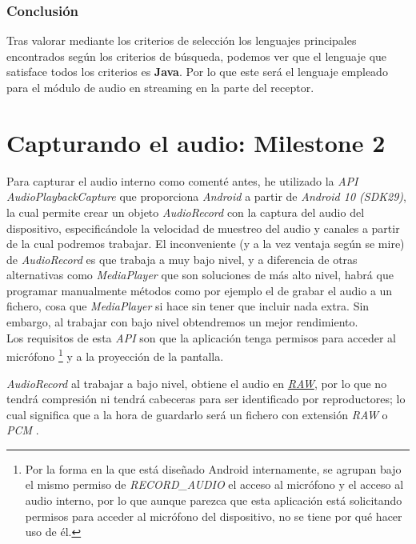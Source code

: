 \subsubsection{Conclusión}

Tras valorar mediante los criterios de selección los lenguajes principales
encontrados según los criterios de búsqueda, podemos ver que el lenguaje que
satisface todos los criterios es \textbf{Java}. Por lo que este será el lenguaje
empleado para el módulo de audio en streaming en la parte del receptor.


\section{Capturando el audio: Milestone 2}

Para capturar el audio interno como comenté antes, he utilizado la \emph{API
AudioPlaybackCapture} \cite{api-audio-capture} que proporciona \emph{Android} a
partir de \emph{Android 10 (SDK29)}, la cual permite crear un objeto
\emph{AudioRecord} \cite{clase-audiorecord} con la captura del audio del
dispositivo, especificándole la velocidad de muestreo del audio y canales a
partir de la cual podremos trabajar. El inconveniente (y a la vez ventaja según
se mire) de \emph{AudioRecord} es que trabaja a muy bajo nivel, y a diferencia
de otras alternativas como \emph{MediaPlayer} \cite{clase-mediaplayer} que son
soluciones de más alto nivel, habrá que programar manualmente métodos como por
ejemplo el de grabar el audio a un fichero, cosa que \emph{MediaPlayer} si hace
sin tener que incluir nada extra. Sin embargo, al trabajar con bajo nivel
obtendremos un mejor rendimiento.\\

Los requisitos de esta \emph{API} son que la
aplicación tenga permisos para acceder al micrófono \footnote{Por la forma en la
que está diseñado Android internamente, se agrupan bajo el mismo permiso de
\emph{RECORD\_AUDIO} el acceso al micrófono y el acceso al audio interno, por lo
que aunque parezca que esta aplicación está solicitando permisos para acceder al
micrófono del dispositivo, no se tiene por qué hacer uso de él.} y a la
proyección de la pantalla.

\emph{AudioRecord} al trabajar a bajo nivel, obtiene el audio en
\href{https://en.wikipedia.org/wiki/Raw_audio_format}{\emph{RAW}}, por lo que no
tendrá compresión ni tendrá cabeceras para ser identificado por reproductores;
lo cual significa que a la hora de guardarlo será un fichero con extensión
\emph{RAW} o \emph{PCM} \cite{audio-pcm}.

